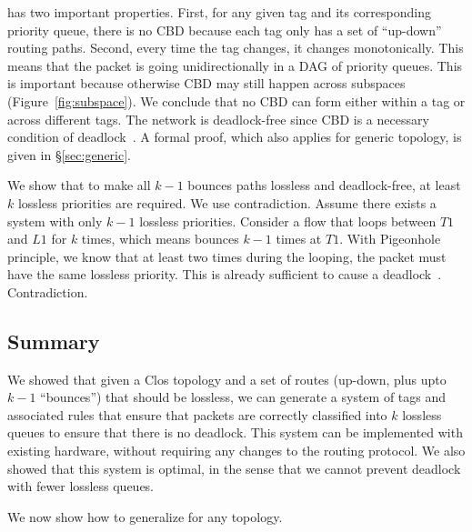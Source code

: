  \sysname{} has two
important properties. First, for any given tag and its corresponding priority
queue, there is no CBD because each tag only has a set of ``up-down'' routing
paths.  Second, every time the tag changes, it changes monotonically. This means
that the packet is going unidirectionally in a DAG of priority queues. This is
important because otherwise CBD may still happen across subspaces
(Figure~\ref{fig:subspace}).  We conclude that no CBD can form either within a
tag or across different tags.  The network is deadlock-free since CBD is a
necessary condition of deadlock~\cite{our_hotnets_paper}.  A formal proof, which
also applies for generic topology, is given in \S\ref{sec:generic}. 

 We show that
to make all $k-1$ bounces paths lossless and deadlock-free, at least $k$
lossless priorities are required. We use contradiction.  Assume there exists a
system with only $k-1$ lossless priorities. Consider a flow that loops between
$T1$ and $L1$ for $k$ times, which means bounces $k-1$ times at $T1$. With
Pigeonhole principle, we know that at least two times during the looping, the
packet must have the same lossless priority. This is already sufficient to cause
a deadlock~\cite{our_hotnets_paper}. Contradiction.

\subsection {Summary}

We showed that given a Clos topology and a set of routes (up-down, plus
upto $k-1$ ``bounces'') that should be lossless, we can generate a system of
tags and associated rules that ensure that packets are correctly classified
into $k$ lossless queues to ensure that there is no deadlock.   This system can
be implemented with existing hardware, without requiring any changes to the
routing protocol. We also showed that this system is optimal, in the sense that
we cannot prevent deadlock with fewer lossless queues.

We now show how to generalize \sysname{} for any topology.
